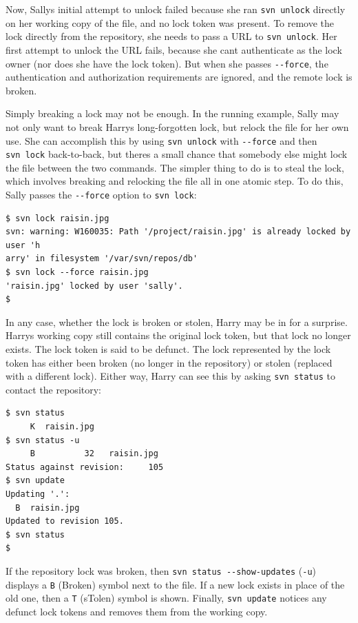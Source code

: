 Now, Sally\textquotesingle s initial attempt to unlock failed because
she ran \texttt{svn\ unlock} directly on her working copy of the file,
and no lock token was present. To remove the lock directly from the
repository, she needs to pass a URL to \texttt{svn\ unlock}. Her first
attempt to unlock the URL fails, because she can\textquotesingle t
authenticate as the lock owner (nor does she have the lock token). But
when she passes \texttt{-\/-force}, the authentication and authorization
requirements are ignored, and the remote lock is broken.

Simply breaking a lock may not be enough. In the running example, Sally
may not only want to break Harry\textquotesingle s long-forgotten lock,
but relock the file for her own use. She can accomplish this by using
\texttt{svn\ unlock} with \texttt{-\/-force} and then \texttt{svn\ lock}
back-to-back, but there\textquotesingle s a small chance that somebody
else might lock the file between the two commands. The simpler thing to
do is to steal the lock, which involves breaking and relocking the file
all in one atomic step. To do this, Sally passes the \texttt{-\/-force}
option to \texttt{svn\ lock}:

\begin{verbatim}
$ svn lock raisin.jpg
svn: warning: W160035: Path '/project/raisin.jpg' is already locked by user 'h
arry' in filesystem '/var/svn/repos/db'
$ svn lock --force raisin.jpg
'raisin.jpg' locked by user 'sally'.
$
\end{verbatim}

In any case, whether the lock is broken or stolen, Harry may be in for a
surprise. Harry\textquotesingle s working copy still contains the
original lock token, but that lock no longer exists. The lock token is
said to be defunct. The lock represented by the lock token has either
been broken (no longer in the repository) or stolen (replaced with a
different lock). Either way, Harry can see this by asking
\texttt{svn\ status} to contact the repository:

\begin{verbatim}
$ svn status
     K  raisin.jpg
$ svn status -u
     B          32   raisin.jpg
Status against revision:     105
$ svn update
Updating '.':
  B  raisin.jpg
Updated to revision 105.
$ svn status
$
\end{verbatim}

If the repository lock was broken, then
\texttt{svn\ status\ -\/-show-updates} (\texttt{-u}) displays a
\texttt{B} (Broken) symbol next to the file. If a new lock exists in
place of the old one, then a \texttt{T} (sTolen) symbol is shown.
Finally, \texttt{svn\ update} notices any defunct lock tokens and
removes them from the working copy.

